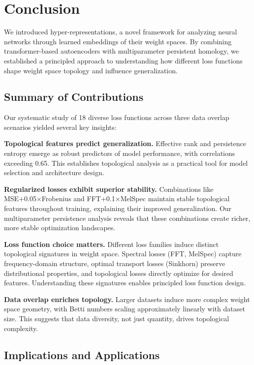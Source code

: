 \section{Conclusion}
\label{sec:conclusion}

We introduced hyper-representations, a novel framework for analyzing neural networks through learned embeddings of their weight spaces. By combining transformer-based autoencoders with multiparameter persistent homology, we established a principled approach to understanding how different loss functions shape weight space topology and influence generalization.

\subsection{Summary of Contributions}

Our systematic study of 18 diverse loss functions across three data overlap scenarios yielded several key insights:

\textbf{Topological features predict generalization.} Effective rank and persistence entropy emerge as robust predictors of model performance, with correlations exceeding 0.65. This establishes topological analysis as a practical tool for model selection and architecture design.

\textbf{Regularized losses exhibit superior stability.} Combinations like MSE+0.05×Frobenius and FFT+0.1×MelSpec maintain stable topological features throughout training, explaining their improved generalization. Our multiparameter persistence analysis reveals that these combinations create richer, more stable optimization landscapes.

\textbf{Loss function choice matters.} Different loss families induce distinct topological signatures in weight space. Spectral losses (FFT, MelSpec) capture frequency-domain structure, optimal transport losses (Sinkhorn) preserve distributional properties, and topological losses directly optimize for desired features. Understanding these signatures enables principled loss function design.

\textbf{Data overlap enriches topology.} Larger datasets induce more complex weight space geometry, with Betti numbers scaling approximately linearly with dataset size. This suggests that data diversity, not just quantity, drives topological complexity.

\subsection{Implications and Applications}

